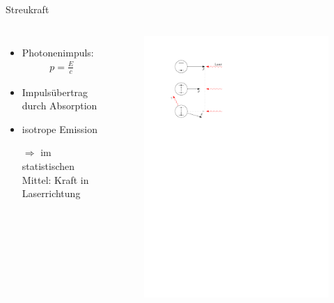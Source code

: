 \documentclass[12pt,xcolor=dvipsnames]{beamer}
\begin{document}
\begin{frame}{Streukraft}
	\begin{columns}[t]
		\begin{itemize}
			\item Photonenimpuls:
			\begin{align*}
				p = \frac{E}{c}
			\end{align*}
			\item Impulsübertrag durch Absorption
			
			\item isotrope Emission
			
			\item[$\Rightarrow$] im statistischen Mittel: Kraft in Laserrichtung
		\end{itemize}
		
		\begin{figure}[h]
			\centering
			\vspace{-1cm}
			\includegraphics[width=1.0\textwidth]{./figures/streukraft.pdf}
		\end{figure}
		
	\end{columns}

\end{frame}
\end{document}
